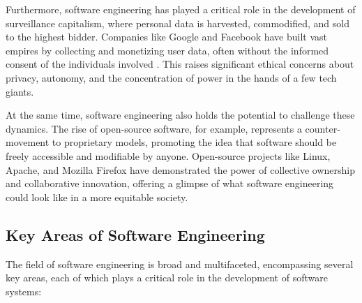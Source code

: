 \begin{refsection}
\begin{multicols}{2}
{Furthermore, software engineering has played a critical role in the development of surveillance capitalism, where personal data is harvested, commodified, and sold to the highest bidder. Companies like Google and Facebook have built vast empires by collecting and monetizing user data, often without the informed consent of the individuals involved \cite[p. 48]{zuboff2019}. This raises significant ethical concerns about privacy, autonomy, and the concentration of power in the hands of a few tech giants.

At the same time, software engineering also holds the potential to challenge these dynamics. The rise of open-source software, for example, represents a counter-movement to proprietary models, promoting the idea that software should be freely accessible and modifiable by anyone. Open-source projects like Linux, Apache, and Mozilla Firefox have demonstrated the power of collective ownership and collaborative innovation, offering a glimpse of what software engineering could look like in a more equitable society.

\subsection{Key Areas of Software Engineering}

The field of software engineering is broad and multifaceted, encompassing several key areas, each of which plays a critical role in the development of software systems:

}
\end{multicols}
\end{refsection}
